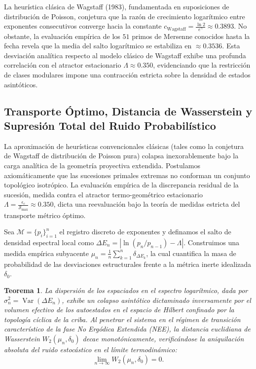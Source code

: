 \documentclass{article}
\numberwithin{equation}{section}
\DeclareMathOperator{\Var}{Var}
\theoremstyle{plain}
\newtheorem{teorema}{Teorema}[section]
\theoremstyle{definition}
\begin{document}
La heurística clásica de Wagstaff (1983), fundamentada en suposiciones de distribución de Poisson, conjetura que la razón de crecimiento logarítmico entre exponentes consecutivos converge hacia la constante $c_{\text{Wagstaff}} = \frac{\ln 2}{e^{\gamma}} \approx 0.3893$. No obstante, la evaluación empírica de los $51$ primos de Mersenne conocidos hasta la fecha revela que la media del salto logarítmico se estabiliza en $\approx 0.3536$. Esta desviación analítica respecto al modelo clásico de Wagstaff exhibe una profunda correlación con el atractor estacionario $\Lambda \approx 0.350$, evidenciando que la restricción de clases modulares impone una contracción estricta sobre la densidad de estados asintóticos.

\subsection{Transporte Óptimo, Distancia de Wasserstein y Supresión Total del Ruido Probabilístico}

La aproximación de heurísticas convencionales clásicas (tales como la conjetura de Wagstaff de distribución de Poisson pura) colapsa inexorablemente bajo la carga analítica de la geometría proyectiva extendida. Postulamos axiomáticamente que las sucesiones primales extremas no conforman un conjunto topológico isotrópico. La evaluación empírica de la discrepancia residual de la sucesión, medida contra el atractor termo-geométrico estacionario $\Lambda = \frac{\epsilon_c}{\mathcal{S}_{\max}} \approx 0.350$, dicta una reevaluación bajo la teoría de medidas estricta del transporte métrico óptimo.

Sea $\mathcal{M} = \{p_i\}_{i=1}^{n}$ el registro discreto de exponentes y definamos el salto de densidad espectral local como $\Delta E_n = \left\lvert \ln(p_n/p_{n-1}) - \Lambda \right\rvert$. Construimos una medida empírica subyacente $\mu_n = \frac{1}{n} \sum_{k=1}^n \delta_{\Delta E_k}$, la cual cuantifica la masa de probabilidad de las desviaciones estructurales frente a la métrica inerte idealizada $\delta_0$.

\begin{teorema}
\label{teo:saturacion_wasserstein}
La dispersión de los espaciados en el espectro logarítmico, dada por $\sigma^2_n = \Var(\Delta E_n)$, exhibe un colapso asintótico dictaminado inversamente por el volumen efectivo de los autoestados en el espacio de Hilbert confinado por la topología cíclica de la criba. Al penetrar el sistema en el régimen de transición característico de la fase No Ergódica Extendida (NEE), la distancia euclidiana de Wasserstein $W_2(\mu_n, \delta_0)$ decae monotónicamente, verificándose la aniquilación absoluta del ruido estocástico en el límite termodinámico:
\begin{equation}
    \lim_{n \to \infty} W_2(\mu_n, \delta_0) = 0.
\end{equation}
\end{teorema}
\end{document}
